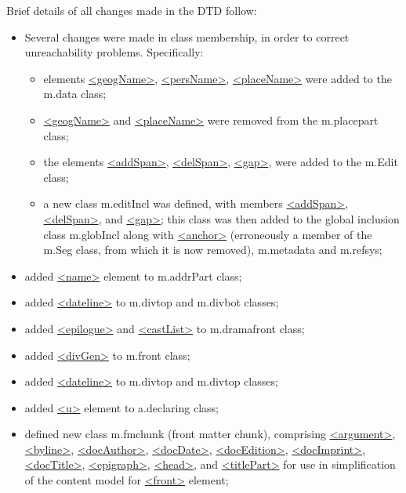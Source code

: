 Brief details of all changes made in the DTD follow: \begin{itemize}
\item Several changes were made in class membership, in order to correct unreachability problems. Specifically: \mbox{}\\[-10pt] \begin{itemize}
\item elements \hyperref[TEI.geogName]{<geogName>}, \hyperref[TEI.persName]{<persName>}, \hyperref[TEI.placeName]{<placeName>} were added to the \textsf{m.data} class;
\item \hyperref[TEI.geogName]{<geogName>} and \hyperref[TEI.placeName]{<placeName>} were removed from the \textsf{m.placepart} class;
\item the elements \hyperref[TEI.addSpan]{<addSpan>}, \hyperref[TEI.delSpan]{<delSpan>}, \hyperref[TEI.gap]{<gap>}, were added to the \textsf{m.Edit} class;
\item a new class \textsf{m.editIncl} was defined, with members \hyperref[TEI.addSpan]{<addSpan>}, \hyperref[TEI.delSpan]{<delSpan>}, and \hyperref[TEI.gap]{<gap>}; this class was then added to the global inclusion class \textsf{m.globIncl} along with \hyperref[TEI.anchor]{<anchor>} (erroneously a member of the \textsf{m.Seg} class, from which it is now removed), \textsf{m.metadata} and \textsf{m.refsys};
\end{itemize} 
\item added \hyperref[TEI.name]{<name>} element to \textsf{m.addrPart} class;
\item added \hyperref[TEI.dateline]{<dateline>} to \textsf{m.divtop} and \textsf{m.divbot} classes;
\item added \hyperref[TEI.epilogue]{<epilogue>} and \hyperref[TEI.castList]{<castList>} to \textsf{m.dramafront} class;
\item added \hyperref[TEI.divGen]{<divGen>} to \textsf{m.front} class;
\item added \hyperref[TEI.dateline]{<dateline>} to \textsf{m.divtop} and \textsf{m.divtop} classes;
\item added \hyperref[TEI.u]{<u>} element to \textsf{a.declaring} class;
\item defined new class \textsf{m.fmchunk} (front matter chunk), comprising \hyperref[TEI.argument]{<argument>}, \hyperref[TEI.byline]{<byline>}, \hyperref[TEI.docAuthor]{<docAuthor>}, \hyperref[TEI.docDate]{<docDate>}, \hyperref[TEI.docEdition]{<docEdition>}, \hyperref[TEI.docImprint]{<docImprint>}, \hyperref[TEI.docTitle]{<docTitle>}, \hyperref[TEI.epigraph]{<epigraph>}, \hyperref[TEI.head]{<head>}, and \hyperref[TEI.titlePart]{<titlePart>} for use in simplification of the content model for \hyperref[TEI.front]{<front>} element;

\end{itemize}
